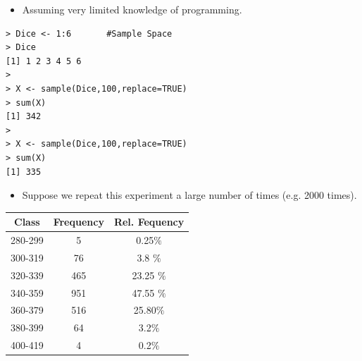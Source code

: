 \begin{frame}[fragile]{\bf {}}
\begin{itemize}
\item Assuming very limited knowledge of programming.
\end{itemize}
\begin{verbatim}
> Dice <- 1:6       #Sample Space
> Dice
[1] 1 2 3 4 5 6
>
> X <- sample(Dice,100,replace=TRUE)
> sum(X)
[1] 342
>
> X <- sample(Dice,100,replace=TRUE)
> sum(X)
[1] 335
\end{verbatim}
\end{frame}
\begin{frame}{\bf {}}
\begin{itemize}
\item Suppose we repeat this experiment a large number of times (e.g. 2000 times).
\end{itemize}
\begin{center}
\begin{tabular}{|c|c|c|}
\hline
Class&Frequency&Rel. Fequency\\
  \hline
  280-299 & 5 & 0.25$\%$ \\
  300-319 & 76 & 3.8 $\%$ \\
  320-339 & 465 & 23.25 $\%$ \\
  340-359 & 951 & 47.55 $\%$\\
  360-379 & 516 & 25.80$\%$\\
  380-399 & 64 & 3.2$\%$\\
  400-419 & 4 & 0.2$\%$ \\

  \hline
\end{tabular}
\end{center}
\end{frame}

